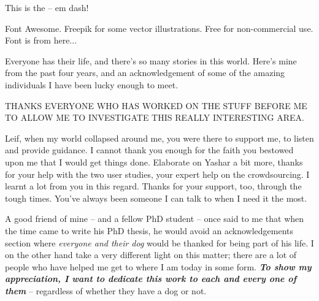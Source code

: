 \begin{preamble}
This is the -- em \textemdash dash!



\todo{========}
 
Font Awesome. Freepik for some vector illustrations. Free for non-commercial use. Font is from here...


Everyone has their life, and there's so many stories in this world. Here's mine from the past four years, and an acknowledgement of some of the amazing individuals I have been lucky enough to meet.

THANKS EVERYONE WHO HAS WORKED ON THE STUFF BEFORE ME TO ALLOW ME TO INVESTIGATE THIS REALLY INTERESTING AREA.

Leif, when my world collapsed around me, you were there to support me, to listen and provide guidance. I cannot thank you enough for the faith you bestowed upon me that I would get things done. Elaborate on Yashar a bit more, thanks for your help with the two user studies, your expert help on the crowdsourcing. I learnt a lot from you in this regard. Thanks for your support, too, through the tough times. You've always been someone I can talk to when I need it the most.




A good friend of mine -- and a fellow PhD student -- once said to me that when the time came to write his PhD thesis, he would avoid an acknowledgements section where \emph{everyone and their dog} would be thanked for being part of his life. I on the other hand take a very different light on this matter; there are a lot of people who have helped me get to where I am today in some form. \textbf{\emph{To show my appreciation, I want to dedicate this work to each and every one of them}} -- regardless of whether they have a dog or not.


\end{preamble}
